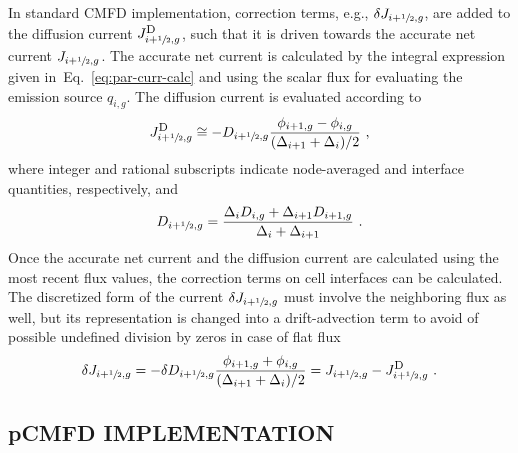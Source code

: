 \documentclass[letterpaper]{physor2020}
\newcommand{\jD}{\ensuremath{J^{\textrm{\scriptsize{D}}}}}
\newcommand{\hzi}{\ensuremath{\sfrac{1}{2}}}
\begin{document}
In standard CMFD implementation, correction terms, e.g., $\delta J_{i+\hzi,g}$, are added to the diffusion current $\jD_{i+\hzi,g}$, such that it is driven towards the accurate net current $J_{i+\hzi,g}$. The accurate net current is calculated by the integral expression given in~Eq.~\ref{eq:par-curr-calc} and using the scalar flux for evaluating the emission source $q_{i,g}$. The diffusion current is evaluated according to 
\begin{equation}\label{eq:JD}
\jD_{i+\hzi,g} \cong -D_{i+\hzi,g} 
\frac{\phi_{i+1,g} - \phi_{i,g}}
{(\Delta_{i+1} + \Delta_i)/2} \,\, ,
\end{equation}
where integer and rational subscripts indicate node-averaged and interface quantities, respectively, and 
\begin{equation}\label{eq:Ds}
D_{i+\hzi,g} = \frac{\Delta_i D_{i,g} + \Delta_{i+1} D_{i+1,g}}
{\Delta_i + \Delta_{i+1}} \, \, .
\end{equation}
%
Once the accurate net current and the diffusion current are calculated using the most recent flux values, the correction terms on cell interfaces can be calculated. The discretized form of the current $\delta J_{i+\hzi,g}$ must involve the neighboring flux as well, but its representation is changed into a drift-advection term to avoid of possible undefined division by zeros in case of flat flux~\cite{Smith-1983,Tomatis-2011}
\begin{equation}
\delta J_{i+\hzi,g} = -\delta D_{i+\hzi,g} 
\frac{\phi_{i+1,g} + \phi_{i,g}}
{(\Delta_{i+1} + \Delta_i)/2} 
= J_{i+\hzi,g} - \jD_{i+\hzi,g}
\,\, .
\end{equation}


\subsection{pCMFD IMPLEMENTATION} 
\label{sec:RM-pCMFD}
\end{document}
